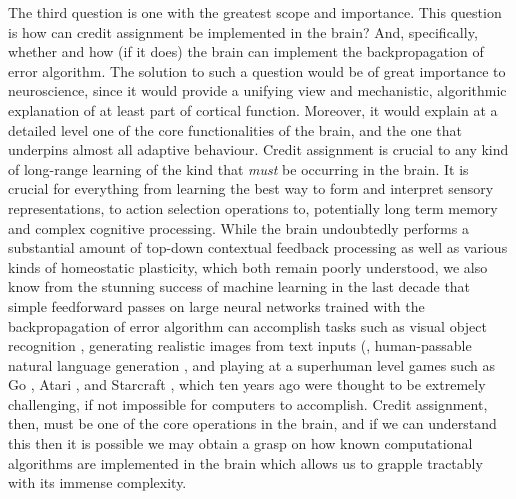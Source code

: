 The third question is one with the greatest scope and importance. This question is how can credit assignment be implemented in the brain? And, specifically, whether and how (if it does) the brain can implement the backpropagation of error algorithm. The solution to such a question would be of great importance to neuroscience, since it would provide a unifying view and mechanistic, algorithmic explanation of at least part of cortical function. Moreover, it would explain at a detailed level one of the core functionalities of the brain, and the one that underpins almost all adaptive behaviour. Credit assignment is crucial to any kind of long-range learning of the kind that \emph{must} be occurring in the brain. It is crucial for everything from learning the best way to form and interpret sensory representations, to action selection operations to, potentially long term memory and complex cognitive processing. While the brain undoubtedly performs a substantial amount of top-down contextual feedback processing as well as various kinds of homeostatic plasticity, which both remain poorly understood, we also know from the stunning success of machine learning in the last decade that simple feedforward passes on large neural networks trained with the backpropagation of error algorithm can accomplish tasks such as visual object recognition \citep{krizhevsky2012imagenet,child2020very}, generating realistic images from text inputs (\citep{radford2021learning}, human-passable natural language generation \citep{radford2019language}, and playing at a superhuman level games such as Go \citep{silver2017mastering}, Atari \citep{mnih2015human,mnih2013playing,schrittwieser2019mastering}, and Starcraft \citep{vinyals2019grandmaster}, which ten years ago were thought to be extremely challenging, if not impossible for computers to accomplish. Credit assignment, then, must be one of the core operations in the brain, and if we can understand this then it is possible we may obtain a grasp on how known computational algorithms are implemented in the brain which allows us to grapple tractably with its immense complexity. 

